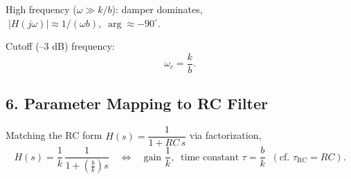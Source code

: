 \documentclass[a4paper,12pt]{article}
\begin{document}
	High frequency ($\omega \gg k/b$): damper dominates, $\;|H(j\omega)| \approx 1/(\omega b),\; \arg \approx -90^\circ.$
	
	Cutoff (–3 dB) frequency:
	$$
	\omega_c = \frac{k}{b}.
	$$
	
	\subsection*{6. Parameter Mapping to RC Filter}
	Matching the RC form $H(s)=\dfrac{1}{1 + RC\,s}$ via factorization,
	$$
	H(s) = \frac{1}{k}\,\frac{1}{1 + \left(\frac{b}{k}\right) s}
	\quad\Longleftrightarrow\quad
	\text{gain } \frac{1}{k},\;\; \text{time constant } \tau = \frac{b}{k}
	\;\;(\text{cf. } \tau_{\text{RC}}=RC).
	$$
	
	
\end{document}
